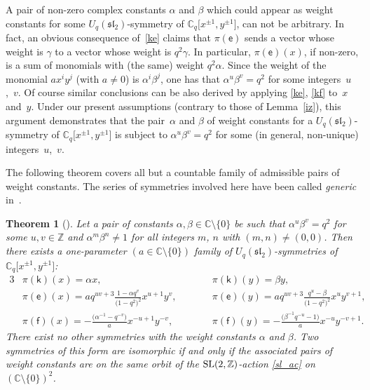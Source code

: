 \documentclass[pdftex]{sigma}
\numberwithin{equation}{section}
\newtheorem{Theorem}{Theorem}[section]
\begin{document}
A pair of non-zero complex constants $\alpha$ and $\beta$ which could appear as weight constants for some $U_q(\mathfrak{sl}_2)$-symmetry of $\mathbb{C}_q\big[x^{\pm 1},y^{\pm 1}\big]$, can not be arbitrary. In fact, an obvious consequence of~\eqref{ke} claims that $\pi(\mathsf{e})$ sends a vector whose weight is $\gamma$ to a vector whose weight is $q^2\gamma$. In particular, $\pi(\mathsf{e})(x)$, if non-zero, is a sum of monomials with (the same) weight $q^2\alpha$. Since the weight of the monomial $ax^iy^j$ (with $a\ne 0$) is $\alpha^i\beta^j$, one has that $\alpha^u\beta^v=q^2$ for some integers~$u$,~$v$. Of course similar conclusions can be also derived by applying \eqref{ke}, \eqref{kf} to~$x$ and~$y$. Under our present assumptions (contrary to those of Lemma~\ref{iz}), this argument demonstrates that the pair~$\alpha$ and $\beta$ of weight constants for a $U_q(\mathfrak{sl}_2)$-symmetry of $\mathbb{C}_q\big[x^{\pm 1},y^{\pm 1}\big]$ is subject to $\alpha^u\beta^v=q^2$ for some (in general, non-unique) integers~$u$,~$v$.

The following theorem covers all but a countable family of admissible pairs of weight constants. The series of symmetries involved here have been called {\it generic} in~\cite{S}.

\begin{Theorem}[{\cite[Theorem 4.1, type (III)]{S}}]\label{gener}
Let a pair of constants $\alpha,\beta\in\mathbb{C}{\setminus}\{0\}$ be such that $\alpha^u\beta^v=q^2$ for some $u,v\in\mathbb{Z}$ and $\alpha^m\beta^n\ne 1$ for all integers $m$, $n$ with $(m,n)\ne(0,0)$. Then there exists a one-parameter $(a\in\mathbb{C}{\setminus}\{0\})$ family of $U_q(\mathfrak{sl}_2)$-symmetries of $\mathbb{C}_q\big[x^{\pm 1},y^{\pm 1}\big]$:
\begin{alignat}{3}
&\pi(\mathsf{k})(x)=\alpha x, \qquad & &\pi(\mathsf{k})(y) =\beta y, & \label{gener_k}\\
& \pi(\mathsf{e})(x) =aq^{uv+3}\frac{1-\alpha q^v}{\big(1-q^2\big)^2}x^{u+1}y^v, \qquad & & \pi(\mathsf{e})(y) =aq^{uv+3}\frac{q^u-\beta}{\big(1-q^2\big)^2}x^uy^{v+1}, & \label{gener_e}\\
& \pi(\mathsf{f})(x) =-\frac{\big(\alpha^{-1}-q^{-v}\big)}{a}x^{-u+1}y^{-v},\qquad && \pi(\mathsf{f})(y) =-\frac{\big(\beta^{-1}q^{-u}-1\big)}{a}x^{-u}y^{-v+1}. &\label{gener_f}
\end{alignat}
There exist no other symmetries with the weight constants $\alpha$ and $\beta$. Two symmetries of this form are isomorphic if and only if the associated pairs of weight constants are on the same orbit of the ${\rm SL}(2,\mathbb{Z})$-action \eqref{sl_ac} on $(\mathbb{C}{\setminus}\{0\})^2$.
\end{Theorem}
\end{document}
